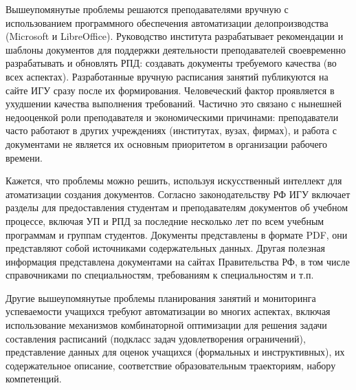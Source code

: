 \documentclass[ 

]{aiitart}
\begin{document}
Вышеупомянутые проблемы решаются преподавателями вручную с использованием программного обеспечения автоматизации делопроизводства (Microsoft и LibreOffice).  Руководство института разрабатывает рекомендации и шаблоны документов для поддержки деятельности преподавателей своевременно разрабатывать и обновлять РПД: создавать документы требуемого качества (во всех аспектах). Разработанные вручную расписания занятий публикуются на сайте ИГУ сразу после их формирования. Человеческий фактор проявляется в ухудшении качества выполнения требований. Частично это связано с нынешней недооценкой роли преподавателя и экономическими причинами: преподаватели часто работают в других учреждениях (институтах, вузах, фирмах), и работа с документами не является их основным приоритетом в организации рабочего времени. 

Кажется, что проблемы можно решить, используя искусственный интеллект для атоматизации создания документов. Согласно законодательству РФ ИГУ включает разделы для предоставления студентам и преподавателям документов об учебном процессе, включая УП и РПД за последние несколько лет по всем учебным программам и группам студентов. Документы представлены в формате PDF, они представляют собой источниками содержательных данных.  Другая полезная информация представлена документами на сайтах Правительства РФ, в том числе справочниками по специальностям, требованиям к специальностям и т.п. 

Другие вышеупомянутые проблемы планирования занятий и мониторинга успеваемости учащихся требуют автоматизации во многих аспектах, включая использование механизмов комбинаторной оптимизации для решения задачи составления расписаний (подкласс задач удовлетворения ограничений), представление данных для оценок учащихся (формальных и инструктивных), их содержательное описание, соответствие образовательным траекториям, набору компетенций. 
\end{document}
